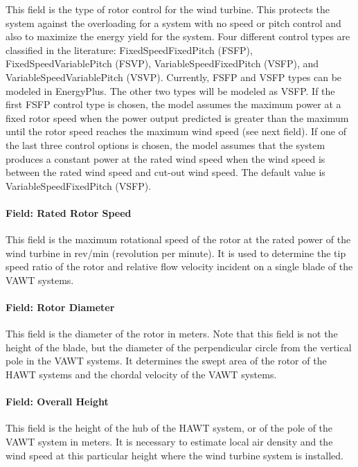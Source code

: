 This field is the type of rotor control for the wind turbine. This protects the system against the overloading for a system with no speed or pitch control and also to maximize the energy yield for the system. Four different control types are classified in the literature: FixedSpeedFixedPitch (FSFP), FixedSpeedVariablePitch (FSVP), VariableSpeedFixedPitch (VSFP), and VariableSpeedVariablePitch (VSVP). Currently, FSFP and VSFP types can be modeled in EnergyPlus. The other two types will be modeled as VSFP. If the first FSFP control type is chosen, the model assumes the maximum power at a fixed rotor speed when the power output predicted is greater than the maximum until the rotor speed reaches the maximum wind speed (see next field). If one of the last three control options is chosen, the model assumes that the system produces a constant power at the rated wind speed when the wind speed is between the rated wind speed and cut-out wind speed. The default value is VariableSpeedFixedPitch (VSFP).

\paragraph{Field: Rated Rotor Speed}\label{field-rated-rotor-speed}

This field is the maximum rotational speed of the rotor at the rated power of the wind turbine in rev/min (revolution per minute). It is used to determine the tip speed ratio of the rotor and relative flow velocity incident on a single blade of the VAWT systems.

\paragraph{Field: Rotor Diameter}\label{field-rotor-diameter}

This field is the diameter of the rotor in meters. Note that this field is not the height of the blade, but the diameter of the perpendicular circle from the vertical pole in the VAWT systems. It determines the swept area of the rotor of the HAWT systems and the chordal velocity of the VAWT systems.

\paragraph{Field: Overall Height}\label{field-overall-height}

This field is the height of the hub of the HAWT system, or of the pole of the VAWT system in meters. It is necessary to estimate local air density and the wind speed at this particular height where the wind turbine system is installed.

